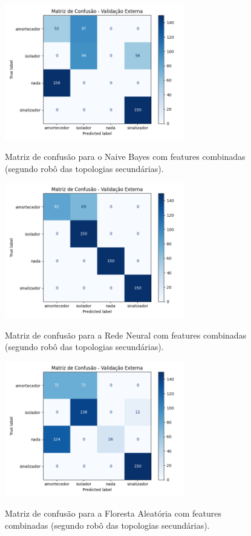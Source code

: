 \begin{figure}[H]
\centering
\caption{Matriz de confusão para o Naive Bayes com features combinadas (segundo robô das topologias secundárias).}
\includegraphics[width=0.7\textwidth]{figuras/Resultados/multi_segundo_Teste5_naive.png}
\label{fig:mc_featcomb_naive_robo2_t5}
\fonte{}
\end{figure}

\begin{figure}[H]
\centering
\caption{Matriz de confusão para a Rede Neural com features combinadas (segundo robô das topologias secundárias).}
\includegraphics[width=0.7\textwidth]{figuras/Resultados/multi_segundo_Teste5_nn.png}
\label{fig:mc_featcomb_nn_robo2_t5}
\fonte{}
\end{figure}

\begin{figure}[H]
\centering
\caption{Matriz de confusão para a Floresta Aleatória com features combinadas (segundo robô das topologias secundárias).}
\includegraphics[width=0.7\textwidth]{figuras/Resultados/multi_segundo_Teste5_rf.png}
\label{fig:mc_featcomb_rf_robo2_t5}
\fonte{}
\end{figure}

